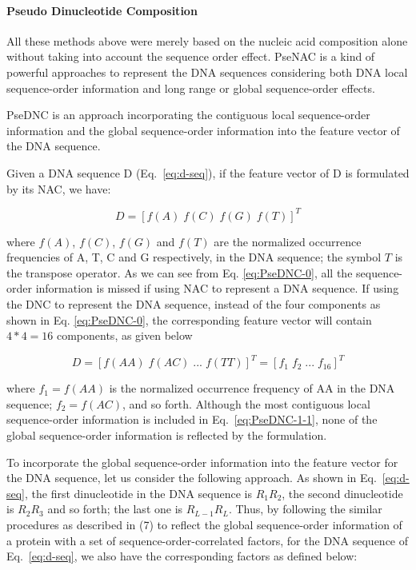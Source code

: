 \paragraph{Pseudo Dinucleotide Composition}


All these methods above were merely based on the nucleic acid composition alone without taking into account the sequence order effect.
\gls{PseNAC} is a kind of powerful approaches to represent the DNA sequences considering both DNA local sequence-order information and long range or global sequence-order effects.

\gls{PseDNC} is an approach incorporating the contiguous local sequence-order information and the global sequence-order information into the feature vector of the DNA sequence. 

Given a DNA sequence D (Eq.~\ref{eq:d-seq}), if the feature vector of D is formulated by its \gls{NAC}, we have:

\begin{equation}\label{eq:PseDNC-0}
    D = [f(A)\;f(C)\;f(G)\;f(T)]^{T}
\end{equation}

where $f(A)$, $f(C)$, $f(G)$ and $f(T)$ are the normalized occurrence frequencies of \gls{A}, \gls{T}, \gls{C} and \gls{G} respectively, in the \gls{DNA} sequence; the symbol $T$ is the transpose operator. As we can see from Eq. \ref{eq:PseDNC-0}, all the sequence-order information is missed if using \gls{NAC} to represent a \gls{DNA} sequence. If using the \gls{DNC} to represent the \gls{DNA} sequence, instead of the four components as shown in Eq. \ref{eq:PseDNC-0}, the corresponding feature vector will contain $4 * 4 = 16$ components, as given below

\begin{equation}\label{eq:PseDNC-1-1}
    D = [f(AA)\;f(AC)\;...\;f(TT)]^{T} = [f_{1}\;f_{2} \;...\;f_{16}]^{T}
\end{equation}

where $f_{1} = f(AA)$ is the normalized occurrence frequency of AA in the \gls{DNA} sequence; $f_{2} = f(AC)$⁠, and so forth. Although the most contiguous local sequence-order information is included in Eq.~\ref{eq:PseDNC-1-1}, none of the global sequence-order information is reflected by the formulation. 

To incorporate the global sequence-order information into the feature vector for the \gls{DNA} sequence, let us consider the following approach. As shown in Eq.~\ref{eq:d-seq}, the first dinucleotide in the \gls{DNA} sequence is $R_{1}R_{2}$, the second dinucleotide is $R_{2}R_{3}$ and so forth; the last one is $R_{L-1}R_{L}$. Thus, by following the similar procedures as described in (7) to reflect the global sequence-order information of a protein with a set of sequence-order-correlated factors, for the \gls{DNA} sequence of Eq.~\ref{eq:d-seq}, we also have the corresponding factors as defined below:

